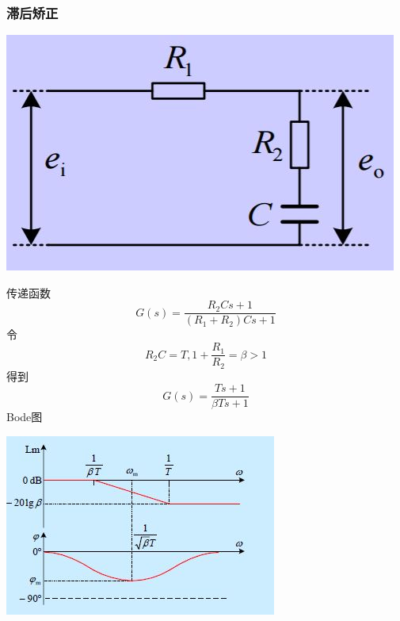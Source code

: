 \documentclass[UTF8,a4paper]{paper}
\begin{document}
\begin{multicols}{2}
\subsubsection{滞后矫正}
\begin{figurehere}
\centering
\includegraphics[width=\columnwidth]{pi.jpg}
\end{figurehere}
传递函数
\begin{equation}
G(s)=\frac{R_2Cs+1}{(R_1+R_2)Cs+1}
\end{equation}
令
$$R_2C=T,1+\frac{R_1}{R_2}=\beta>1$$
得到
\begin{equation}
G(s)=\frac{Ts+1}{\beta Ts+1}
\end{equation}
Bode图

\begin{figurehere}
\centering
\includegraphics[width=\columnwidth]{bodepi.jpg}
\end{figurehere}
\end{multicols}
\end{document}
